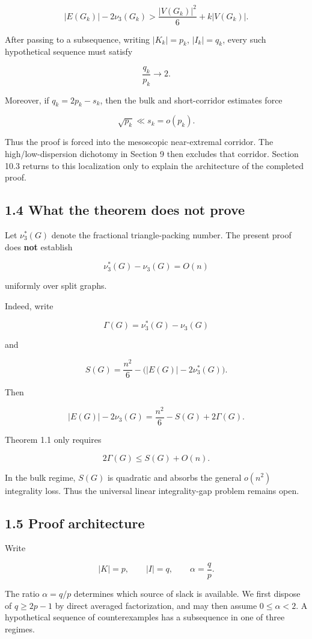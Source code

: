 \documentclass[
  american,
  11pt,
  a4paper,
]{article}
\begin{document}
\[
|E(G_k)|-2\nu_3(G_k)>\frac{|V(G_k)|^2}{6}+k|V(G_k)|.
\]

After passing to a subsequence, writing \(|K_k|=p_k\), \(|I_k|=q_k\), every such hypothetical sequence must satisfy

\[
\frac{q_k}{p_k}\longrightarrow 2.
\]

Moreover, if \(q_k=2p_k-s_k\), then the bulk and short-corridor estimates force

\[
\sqrt{p_k}\ll s_k=o(p_k).
\]

Thus the proof is forced into the mesoscopic near-extremal corridor. The high/low-dispersion dichotomy in Section 9 then excludes that corridor. Section 10.3 returns to this localization only to explain the architecture of the completed proof.

\subsection{1.4 What the theorem does not prove}\label{what-the-theorem-does-not-prove}

Let \(\nu_3^*(G)\) denote the fractional triangle-packing number. The present proof does \textbf{not} establish

\[
\nu_3^*(G)-\nu_3(G)=O(n)
\tag{1.4}
\]

uniformly over split graphs.

Indeed, write

\[
\Gamma(G)=\nu_3^*(G)-\nu_3(G)
\]

and

\[
S(G)=\frac{n^2}{6}-\bigl(|E(G)|-2\nu_3^*(G)\bigr).
\]

Then

\[
|E(G)|-2\nu_3(G)
=
\frac{n^2}{6}-S(G)+2\Gamma(G).
\tag{1.5}
\]

Theorem 1.1 only requires

\[
2\Gamma(G)\le S(G)+O(n).
\]

In the bulk regime, \(S(G)\) is quadratic and absorbs the general \(o(n^2)\) integrality loss. Thus the universal linear integrality-gap problem remains open.

\subsection{1.5 Proof architecture}\label{proof-architecture}

Write

\[
|K|=p,
\qquad
|I|=q,
\qquad
\alpha=\frac qp.
\]

The ratio \(\alpha=q/p\) determines which source of slack is available. We first dispose of \(q\ge2p-1\) by direct averaged factorization, and may then assume \(0\le\alpha<2\). A hypothetical sequence of counterexamples has a subsequence in one of three regimes.
\end{document}
